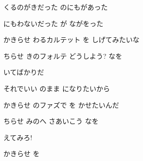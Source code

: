\documentclass[a4paper,tate,twocolumn,12pt]{ltjtarticle}
\begin{document}
\begin{flushleft}
\vspace{2em}

\noindent\begin{minipage}{\linewidth}
くるのがきだった のにもがあった

にもわないだった が ながをった
\end{minipage}

\vspace{2em}

\noindent\begin{minipage}{\linewidth}
かきらせ わるカルテット を しげてみたいな

ちらせ きのフォルテ どうしよう? なを
\end{minipage}

\vspace{2em}

\noindent\begin{minipage}{\linewidth}
 いてばかりだ

それでいい のまま になりたいから
\end{minipage}

\vspace{2em}

\noindent\begin{minipage}{\linewidth}
かきらせ のファズで を かせたいんだ

ちらせ みのへ さあいこう なを

 えてみろ!
\end{minipage}

\vspace{2em}

\noindent\begin{minipage}{\linewidth}
かきらせ を
\end{minipage}

\end{flushleft}
\end{document}
